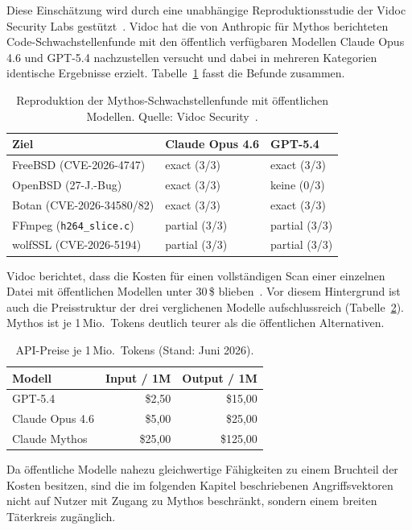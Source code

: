 Diese Einschätzung wird durch eine unabhängige Reproduktionsstudie der Vidoc Security Labs gestützt~\cite{vidoc_mythos_reproduction_2026}. Vidoc hat die von Anthropic für Mythos berichteten Code-Schwachstellenfunde mit den öffentlich verfügbaren Modellen Claude Opus 4.6 und GPT-5.4 nachzustellen versucht und dabei in mehreren Kategorien identische Ergebnisse erzielt. Tabelle~\ref{tab:vidoc_repro} fasst die Befunde zusammen.

\begin{table}[!htbp]
\renewcommand{\arraystretch}{1.2}
\caption{Reproduktion der Mythos-Schwachstellenfunde mit öffentlichen Modellen. Quelle: Vidoc Security~\cite{vidoc_mythos_reproduction_2026}.}
\label{tab:vidoc_repro}
\centering
\footnotesize
\begin{tabular}{|l|l|l|}
\hline
\textbf{Ziel} & \textbf{Claude Opus 4.6} & \textbf{GPT-5.4} \\
\hline
FreeBSD (CVE-2026-4747) & exact (3/3) & exact (3/3) \\
\hline
OpenBSD (27-J.-Bug) & exact (3/3) & keine (0/3) \\
\hline
Botan (CVE-2026-34580/82) & exact (3/3) & exact (3/3) \\
\hline
FFmpeg (\texttt{h264\_slice.c}) & partial (3/3) & partial (3/3) \\
\hline
wolfSSL (CVE-2026-5194) & partial (3/3) & partial (3/3) \\
\hline
\end{tabular}
\end{table}

Vidoc berichtet, dass die Kosten für einen vollständigen Scan einer einzelnen Datei mit öffentlichen Modellen unter 30\,\$ blieben~\cite{vidoc_mythos_reproduction_2026}. Vor diesem Hintergrund ist auch die Preisstruktur der drei verglichenen Modelle aufschlussreich (Tabelle~\ref{tab:pricing}). Mythos ist je 1\,Mio.~Tokens deutlich teurer als die öffentlichen Alternativen.

\begin{table}[!htbp]
\renewcommand{\arraystretch}{1.2}
\caption{API-Preise je 1\,Mio.~Tokens (Stand: Juni 2026).}
\label{tab:pricing}
\centering
\footnotesize
\begin{tabular}{|l|r|r|}
\hline
\textbf{Modell} & \textbf{Input / 1M} & \textbf{Output / 1M} \\
\hline
GPT-5.4 & \$2{,}50 & \$15{,}00 \\
\hline
Claude Opus 4.6 & \$5{,}00 & \$25{,}00 \\
\hline
Claude Mythos & \$25{,}00 & \$125{,}00 \\
\hline
\end{tabular}
\end{table}

Da öffentliche Modelle nahezu gleichwertige Fähigkeiten zu einem Bruchteil der Kosten besitzen, sind die im folgenden Kapitel beschriebenen Angriffsvektoren nicht auf Nutzer mit Zugang zu Mythos beschränkt, sondern einem breiten Täterkreis zugänglich.
